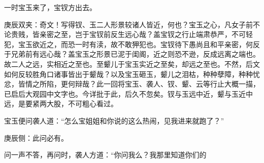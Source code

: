 \begin{parag}
    一时宝玉来了，宝钗方出去。\begin{note}庚辰双夹：奇文！写得钗、玉二人形景较诸人皆近，何也？宝玉之心，凡女子前不论贵贱，皆亲密之至，岂于宝钗前反生远心哉？盖宝钗之行止端肃恭严，不可轻犯，宝玉欲近之，而恐一时有渎，故不敢狎犯也。宝钗待下愚尚且和平亲密，何反于兄弟前有远心哉？盖宝玉之形景已泥于闺阁，近之则恐不逊，反成远离之端也。故二人之远，实相近之至也。至颦儿于宝玉实近之至矣，却远之至也。不然，后文如何反较胜角口诸事皆出于颦哉？以及宝玉砸玉，颦儿之泪枯，种种孽障，种种忧忿，皆情之所陷，更何辩哉？此一回将宝玉、袭人、钗、颦、云等行止大概一描，已启后大观园中文字也。今详批于此，后久不忽矣。钗与玉远中近，颦与玉近中远，是要紧两大股，不可粗心看过。\end{note}宝玉便问袭人道：“怎么宝姐姐和你说的这么热闹，见我进来就跑了？”\begin{note}庚辰侧：此问必有。\end{note}问一声不答，再问时，袭人方道：“你问我么？我那里知道你们的
\end{parag}
